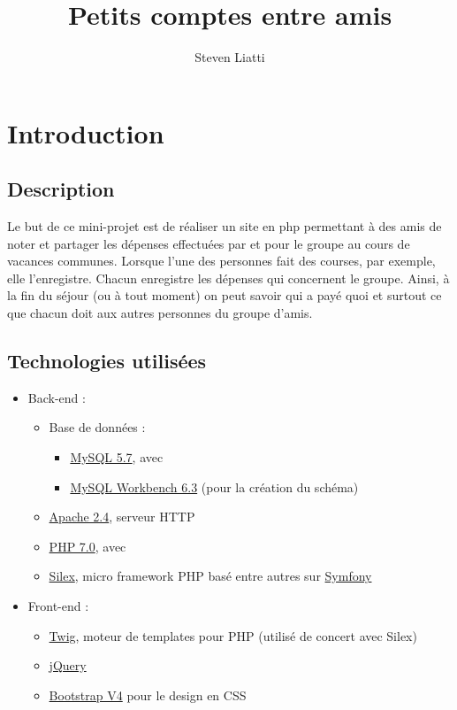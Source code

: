 \documentclass[a4paper, 11pt]{article}
\begin{document}
\title{Petits comptes entre amis} 
\author{Steven Liatti} 
\maketitle

\section{Introduction}
\subsection{Description}
Le but de ce mini-projet est de réaliser un site en php permettant à des amis de noter et
partager les dépenses effectuées par et pour le groupe au cours de vacances
communes. Lorsque l’une des personnes fait des courses, par exemple, elle l’enregistre.
Chacun enregistre les dépenses qui concernent le groupe. Ainsi, à la fin du séjour (ou à
tout moment) on peut savoir qui a payé quoi et surtout ce que chacun doit aux autres
personnes du groupe d’amis.

\subsection{Technologies utilisées}
\begin{itemize}
	\item Back-end :
	\begin{itemize}
		\item Base de données :
		\begin{itemize}
			\item \href{https://www.mysql.com/}{MySQL 5.7}, avec
			\item \href{https://www.mysql.com/products/workbench/}{MySQL Workbench 6.3} (pour la création du schéma)
		\end{itemize}
		\item \href{https://httpd.apache.org/}{Apache 2.4}, serveur HTTP
		\item \href{http://php.net/}{PHP 7.0}, avec
		\item \href{https://silex.symfony.com/}{Silex}, micro framework PHP basé entre autres sur \href{https://symfony.com/}{Symfony}
	\end{itemize}
	\item Front-end :
	\begin{itemize}
		\item \href{https://twig.symfony.com/}{Twig}, moteur de templates pour PHP (utilisé de concert avec Silex)
		\item \href{https://jquery.org/}{jQuery}
		\item \href{http://getbootstrap.com/}{Bootstrap V4} pour le design en CSS
	\end{itemize}
\end{itemize}
\end{document}
